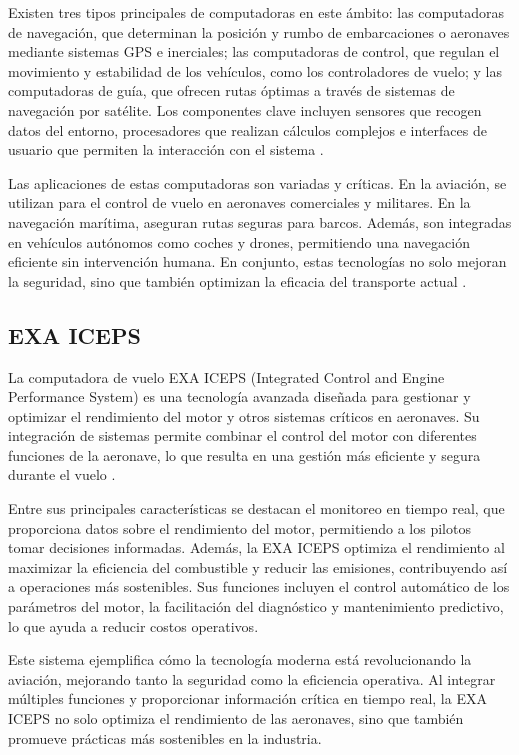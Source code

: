 Existen tres tipos principales de computadoras en este ámbito: las computadoras de navegación, que determinan la posición y rumbo de embarcaciones o aeronaves mediante sistemas GPS e inerciales; las computadoras de control, que regulan el movimiento y estabilidad de los vehículos, como los controladores de vuelo; y las computadoras de guía, que ofrecen rutas óptimas a través de sistemas de navegación por satélite. Los componentes clave incluyen sensores que recogen datos del entorno, procesadores que realizan cálculos complejos e interfaces de usuario que permiten la interacción con el sistema \cite{pirat2017mission}.

Las aplicaciones de estas computadoras son variadas y críticas. En la aviación, se utilizan para el control de vuelo en aeronaves comerciales y militares. En la navegación marítima, aseguran rutas seguras para barcos. Además, son integradas en vehículos autónomos como coches y drones, permitiendo una navegación eficiente sin intervención humana. En conjunto, estas tecnologías no solo mejoran la seguridad, sino que también optimizan la eficacia del transporte actual \cite{pirat2017mission}.

\subsection{EXA ICEPS}\label{sec:exaiceps}
La computadora de vuelo EXA ICEPS (Integrated Control and Engine Performance System) es una tecnología avanzada diseñada para gestionar y optimizar el rendimiento del motor y otros sistemas críticos en aeronaves. Su integración de sistemas permite combinar el control del motor con diferentes funciones de la aeronave, lo que resulta en una gestión más eficiente y segura durante el vuelo \cite{m32019iceps}.

Entre sus principales características se destacan el monitoreo en tiempo real, que proporciona datos sobre el rendimiento del motor, permitiendo a los pilotos tomar decisiones informadas. Además, la EXA ICEPS optimiza el rendimiento al maximizar la eficiencia del combustible y reducir las emisiones, contribuyendo así a operaciones más sostenibles. Sus funciones incluyen el control automático de los parámetros del motor, la facilitación del diagnóstico y mantenimiento predictivo, lo que ayuda a reducir costos operativos\cite{m32019iceps}.

Este sistema ejemplifica cómo la tecnología moderna está revolucionando la aviación, mejorando tanto la seguridad como la eficiencia operativa. Al integrar múltiples funciones y proporcionar información crítica en tiempo real, la EXA ICEPS no solo optimiza el rendimiento de las aeronaves, sino que también promueve prácticas más sostenibles en la industria\cite{m32019iceps}.

